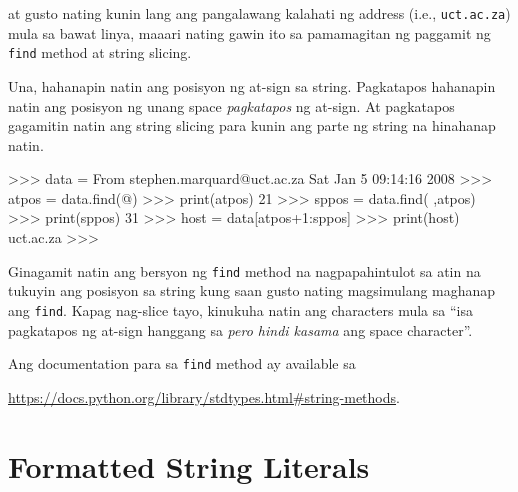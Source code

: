\documentclass[10pt,]{book}
\newenvironment{Shaded}{}{}
\newcommand{\BuiltInTok}[1]{\textcolor[rgb]{0.00,0.50,0.00}{#1}}
\newcommand{\DecValTok}[1]{\textcolor[rgb]{0.25,0.63,0.44}{#1}}
\newcommand{\NormalTok}[1]{#1}
\newcommand{\OperatorTok}[1]{\textcolor[rgb]{0.40,0.40,0.40}{#1}}
\newcommand{\StringTok}[1]{\textcolor[rgb]{0.25,0.44,0.63}{#1}}
\begin{document}
at gusto nating kunin lang ang pangalawang kalahati ng address (i.e.,
\texttt{uct.ac.za}) mula sa bawat linya, maaari nating gawin ito sa
pamamagitan ng paggamit ng \texttt{find} method at string slicing.

Una, hahanapin natin ang posisyon ng at-sign sa string. Pagkatapos
hahanapin natin ang posisyon ng unang space \emph{pagkatapos} ng
at-sign. At pagkatapos gagamitin natin ang string slicing para kunin ang
parte ng string na hinahanap natin.

\begin{Shaded}
\begin{Highlighting}[]
\OperatorTok{\textgreater{}\textgreater{}\textgreater{}}\NormalTok{ data }\OperatorTok{=} \StringTok{\textquotesingle{}From stephen.marquard@uct.ac.za Sat Jan  5 09:14:16 2008\textquotesingle{}}
\OperatorTok{\textgreater{}\textgreater{}\textgreater{}}\NormalTok{ atpos }\OperatorTok{=}\NormalTok{ data.find(}\StringTok{\textquotesingle{}@\textquotesingle{}}\NormalTok{)}
\OperatorTok{\textgreater{}\textgreater{}\textgreater{}} \BuiltInTok{print}\NormalTok{(atpos)}
\DecValTok{21}
\OperatorTok{\textgreater{}\textgreater{}\textgreater{}}\NormalTok{ sppos }\OperatorTok{=}\NormalTok{ data.find(}\StringTok{\textquotesingle{} \textquotesingle{}}\NormalTok{,atpos)}
\OperatorTok{\textgreater{}\textgreater{}\textgreater{}} \BuiltInTok{print}\NormalTok{(sppos)}
\DecValTok{31}
\OperatorTok{\textgreater{}\textgreater{}\textgreater{}}\NormalTok{ host }\OperatorTok{=}\NormalTok{ data[atpos}\OperatorTok{+}\DecValTok{1}\NormalTok{:sppos]}
\OperatorTok{\textgreater{}\textgreater{}\textgreater{}} \BuiltInTok{print}\NormalTok{(host)}
\NormalTok{uct.ac.za}
\OperatorTok{\textgreater{}\textgreater{}\textgreater{}}
\end{Highlighting}
\end{Shaded}

Ginagamit natin ang bersyon ng \texttt{find} method na nagpapahintulot
sa atin na tukuyin ang posisyon sa string kung saan gusto nating
magsimulang maghanap ang \texttt{find}. Kapag nag-slice tayo, kinukuha
natin ang characters mula sa ``isa pagkatapos ng at-sign hanggang sa
\emph{pero hindi kasama} ang space character''.

Ang documentation para sa \texttt{find} method ay available sa

\url{https://docs.python.org/library/stdtypes.html\#string-methods}.

\section{Formatted String Literals}\label{formatted-string-literals}
\end{document}
